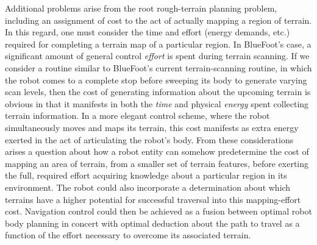 Additional problems arise from the root rough-terrain planning problem, including an assignment of cost to the act of actually mapping a region of terrain. In this regard, one must consider the time and effort (energy demands, etc.) required for completing a terrain map of a particular region. In BlueFoot's case, a significant amount of general control \emph{effort} is spent during terrain scanning. If we consider a routine similar to BlueFoot's current terrain-scanning routine, in which the robot comes to a complete stop before sweeping its body to generate varying scan levels, then the cost of generating information about the upcoming terrain is obvious in that it manifests in both the \emph{time} and physical \emph{energy} spent collecting terrain information. In a more elegant control scheme, where the robot simultaneously moves and maps its terrain, this cost manifests as extra energy exerted in the act of articulating the robot's body. From these considerations arises a question about how a robot entity can somehow predetermine the cost of mapping an area of terrain, from a smaller set of terrain features, before exerting the full, required effort acquiring knowledge about a particular region in its environment. The robot could also incorporate a determination about which terrains have a higher potential for successful traversal into this mapping-effort cost. Navigation control could then be achieved as a fusion between optimal robot body planning in concert with optimal deduction about the path to travel as a function of the effort necessary to overcome its associated terrain.